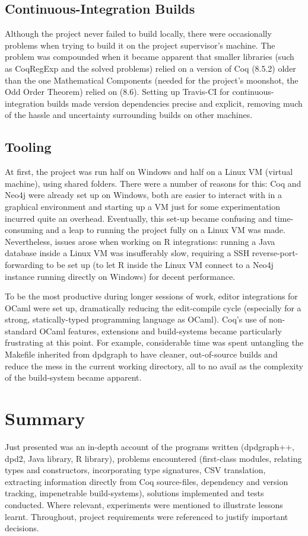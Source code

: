 \subsection{Continuous-Integration Builds}

Although the project never failed to build locally, there were occasionally
problems when trying to build it on the project supervisor's machine. The
problem was compounded when it became apparent that smaller libraries (such as
CoqRegExp and the solved problems) relied on a version of Coq (8.5.2) older than
the one Mathematical Components (needed for the project's moonshot, the Odd
Order Theorem) relied on (8.6). Setting up Travis-CI for continuous-integration
builds made version dependencies precise and explicit, removing much of the
hassle and uncertainty surrounding builds on other machines.

\subsection{Tooling}

At first, the project was run half on Windows and half on a Linux VM (virtual
machine), using shared folders. There were a number of reasons for this: Coq
and Neo4j were already set up on Windows, both are easier to interact with in a
graphical environment and starting up a VM just for some experimentation
incurred quite an overhead.  Eventually, this set-up became confusing and
time-consuming and a leap to running the project fully on a Linux VM was made.
Nevertheless, issues arose when working on R integrations: running a Java
database inside a Linux VM was insufferably slow, requiring a SSH
reverse-port-forwarding to be set up (to let R inside the Linux VM connect to
a Neo4j instance running directly on Windows) for decent performance.

To be the most productive during longer sessions of work, editor integrations
for OCaml were set up, dramatically reducing the edit-compile cycle (especially
for a strong, statically-typed programming language as OCaml). Coq's use of
non-standard OCaml features, extensions and build-systems became particularly
frustrating at this point. For example, considerable time was spent untangling
the Makefile inherited from dpdgraph to have cleaner, out-of-source builds and
reduce the mess in the current working directory, all to no avail as the
complexity of the build-system became apparent.

\section{Summary}

Just presented was an in-depth account of the programs written (dpdgraph++,
dpd2, Java library, R library), problems encountered (first-class modules,
relating types and constructors, incorporating type signatures, CSV
translation, extracting information directly from Coq source-files, dependency
and version tracking, impenetrable build-systems), solutions implemented and
tests conducted. Where relevant, experiments were mentioned to illustrate
lessons learnt. Throughout, project requirements were referenced to justify
important decisions.
